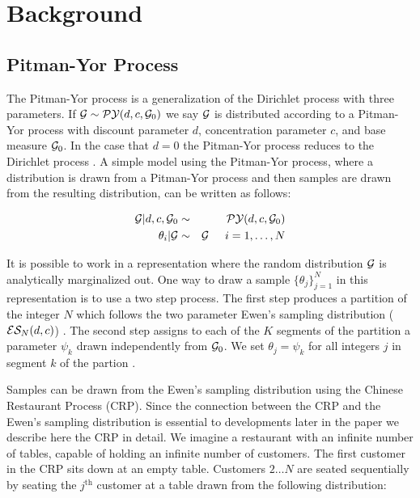 
\section{Background}
\label{basicModel}

\subsection{Pitman-Yor Process}

The Pitman-Yor process is a generalization of the Dirichlet process with three parameters.   If $\G \sim \PY(d,c,\G_0)$ we say $\G$ is distributed according to a Pitman-Yor process with discount parameter $d$, concentration parameter $c$, and base measure $\G_0$. In the case that $d = 0$ the Pitman-Yor process reduces to the Dirichlet process \cite{Pitman1997}.  A simple model using the Pitman-Yor process, where a distribution is drawn from a Pitman-Yor process and then samples are drawn from the resulting distribution, can be written as follows:

\begin{eqnarray*}
\G | d,c,\G_0 &\sim& \PY(d,c,\G_0)\\
\theta_i | \G &\sim& \G  \hspace{.5cm} i = 1, \dots, N
\end{eqnarray*}

It is possible to work in a representation where the random distribution $\G$ is analytically marginalized out.  One way to draw a sample $\{ \theta_j \}_{j = 1}^N$ in this representation is to use a two step process.  The first step produces a partition of the integer $N$ which follows the two parameter Ewen's sampling distribution ($\ES_N(d,c)$) \cite{Ewens1995}.  The second step assigns to each of the $K$ segments of the partition a parameter $\psi_k$ drawn independently from $\G_0$.  We set $\theta_j = \psi_k$ for all integers $j$ in segment $k$ of the partion \cite{Blackwell1973}.

Samples can be drawn from the Ewen's sampling distribution using the Chinese Restaurant Process (CRP).  Since the connection between the CRP and the Ewen's sampling distribution is essential to developments later in the paper we describe here the CRP in detail. We imagine a restaurant with an infinite number of tables, capable of holding an infinite number of customers.  The first customer in the CRP sits down at an empty table.  Customers $2 \dots N$ are seated sequentially by seating the $j^{\mathrm{th}}$ customer at a table drawn from the following distribution:

